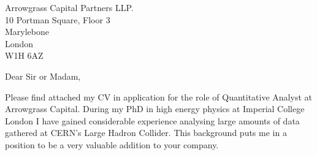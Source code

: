 
\begin{minipage}{0.5\textwidth}
Arrowgrass Capital Partners LLP.\\
10 Portman Square, Floor 3\\
Marylebone\\
London\\
W1H 6AZ\\
\vspace{3em}
\end{minipage}




Dear Sir or Madam,





Please find attached my CV in application for the role of Quantitative Analyst at Arrowgrass Capital.
During my PhD in high energy physics at Imperial College London I have gained considerable
experience analysing large amounts of data gathered at CERN's Large Hadron Collider.
This background puts me in a position to be a very valuable addition to your company.


